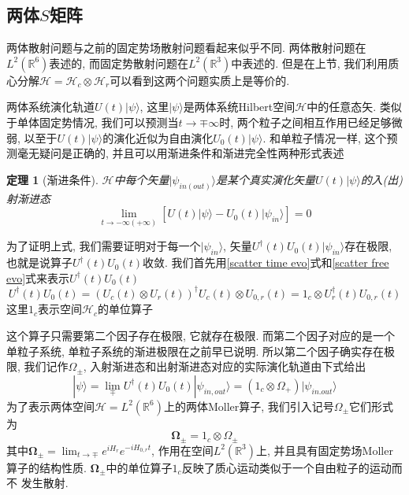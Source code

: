 \documentclass[a4paper,11pt]{book}
\newtheorem{theorem}{\hspace{2em}定理}[section]
\begin{document}
\subsection{两体$S$矩阵}
两体散射问题与之前的固定势场散射问题看起来似乎不同. 两体散射问题在$L^2(\mathbb{R}^6)$表述的, 而固定势散射问题在$L^2(\mathbb{R}^3)$中表述的. 但是在上节, 我们利用质心分解$\mathcal{H}=\mathcal{H}_c\otimes\mathcal{H}_r$可以看到这两个问题实质上是等价的.

两体系统演化轨道$U(t)|\psi\rangle$, 这里$|\psi\rangle$是两体系统Hilbert空间$\mathcal{H}$中的任意态矢. 类似于单体固定势情况, 我们可以预测当$t\to\mp\infty$时, 两个粒子之间相互作用已经足够微弱, 以至于$U(t)|\psi\rangle$的演化近似为自由演化$U_0(t)|\psi\rangle$. 和单粒子情况一样, 这个预测毫无疑问是正确的, 并且可以用渐进条件和渐进完全性两种形式表述
\begin{theorem}[渐进条件]
  $\mathcal{H}$中每个矢量$|\psi_{in(out)}\rangle$是某个真实演化矢量$U(t)|\psi\rangle$的入(出)射渐进态
  \begin{equation*}
    \lim_{t\to-\infty(+\infty)}[U(t)|\psi\rangle-U_0(t)|\psi_{in}\rangle]=0
  \end{equation*}
\end{theorem}
为了证明上式, 我们需要证明对于每一个$|\psi_{in}\rangle$, 矢量$U^\dag(t)U_0(t)|\psi_{in}\rangle$存在极限, 也就是说算子$U^\dag(t)U_0(t)$收敛. 我们首先用\eqref{scatter time evo}式和\eqref{scatter free evo}式来表示$U^\dag(t)U_0(t)$
\begin{equation*}
  U^\dag(t)U_0(t)=(U_c(t)\otimes U_r(t))^\dag U_c(t)\otimes U_{0,r}(t)=1_c\otimes U_r^\dag(t)U_{0,r}(t)
\end{equation*}
这里$1_c$表示空间$\mathcal{H}_c$的单位算子

这个算子只需要第二个因子存在极限, 它就存在极限. 而第二个因子对应的是一个单粒子系统, 单粒子系统的渐进极限在之前早已说明. 所以第二个因子确实存在极限, 我们记作$\Omega_\pm$, 入射渐进态和出射渐进态对应的实际演化轨道由下式给出
\begin{equation*}
  |\psi\rangle=\lim_{\mp}U^\dag(t)U_0(t)|\psi_{in,out}\rangle=(1_c\otimes\Omega_+)|\psi_{in.out}\rangle
\end{equation*}
为了表示两体空间$\mathcal{H}=L^2(\mathbb{R}^6)$上的两体Moller算子, 我们引入记号$\Omega_\pm$它们形式为
\begin{equation}\label{scatter two moller}
  \mathbf{\Omega}_\pm=1_c\otimes\Omega_{\pm}
\end{equation}
其中$\mathbf{\Omega}_\pm=\lim_{t\to\mp}e^{iH_r}e^{-iH_{0,r}t}$, 作用在空间$L^2(\mathbb{R}^3)$上, 并且具有固定势场Moller算子的结构性质. $\mathbf{\Omega}_\pm$中的单位算子$1_c$反映了质心运动类似于一个自由粒子的运动而不 发生散射.
\end{document}
